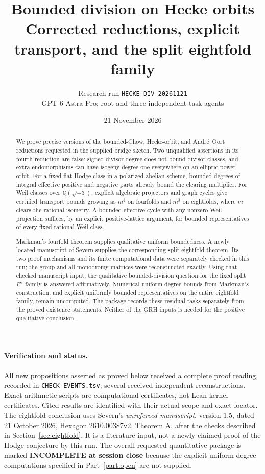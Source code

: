 \documentclass[11pt,a4paper]{article}
\title{Bounded division on Hecke orbits\\\large Corrected reductions, explicit transport, and the split eightfold family}
\author{Research run \texttt{HECKE\_DIV\_20261121}\\\small GPT-6 Astra Pro; root and three independent task agents}
\date{21 November 2026}
\theoremstyle{definition}\newtheorem{definition}[theorem]{Definition}
\theoremstyle{remark}\newtheorem{remark}[theorem]{Remark}
\newcommand{\Q}{\mathbb Q}\newcommand{\Z}{\mathbb Z}\newcommand{\C}{\mathbb C}\newcommand{\R}{\mathbb R}
\begin{document}
\maketitle
\begin{abstract}
We prove precise versions of the bounded-Chow, Hecke-orbit, and Andr\'e--Oort reductions requested in the supplied bridge sketch. Two unqualified assertions in its fourth reduction are false: signed divisor degree does not bound divisor classes, and extra endomorphisms can have isogeny degree one everywhere on an elliptic-power orbit. For a fixed flat Hodge class in a polarized abelian scheme, bounded degrees of integral effective positive and negative parts already bound the clearing multiplier. For Weil classes over $\Q(\sqrt{-3})$, explicit algebraic projectors and graph cycles give certified transport bounds growing as $m^4$ on fourfolds and $m^8$ on eightfolds, where $m$ clears the rational isometry. A bounded effective cycle with any nonzero Weil projection suffices, by an explicit positive-lattice argument, for bounded representatives of every fixed rational Weil class.

Markman's fourfold theorem supplies qualitative uniform boundedness. A newly located manuscript of Severn supplies the corresponding split eightfold theorem. Its two proof mechanisms and its finite computational data were separately checked in this run; the group and all monodromy matrices were reconstructed exactly. Using that checked manuscript input, the qualitative bounded-division question for the fixed split $E^8$ family is answered affirmatively. Numerical uniform degree bounds from Markman's construction, and explicit uniformly bounded representatives on the entire eightfold family, remain uncomputed. The package records these residual tasks separately from the proved existence statements. Neither of the GRH inputs is needed for the positive qualitative conclusion.
\end{abstract}

\paragraph{Verification and status.}
All new propositions asserted as proved below received a complete proof reading, recorded in \texttt{CHECK\_EVENTS.tsv}; several received independent reconstructions. Exact arithmetic scripts are computational certificates, not Lean kernel certificates. Cited results are identified with their actual scope and exact locator. The eightfold conclusion uses Severn's \emph{unrefereed manuscript}, version 1.5, dated 21 October 2026, Hexagon 2610.00387v2, Theorem A, after the checks described in Section~\ref{sec:eightfold}. It is a literature input, not a newly claimed proof of the Hodge conjecture by this run. The overall requested quantitative package is marked \textbf{INCOMPLETE at session close} because the explicit uniform degree computations specified in Part~\ref{part:open} are not supplied.
\end{document}
